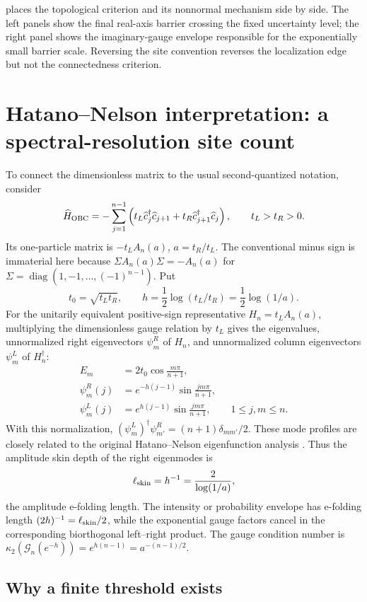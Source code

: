 \documentclass[review,hidelinks,onefignum,onetabnum]{siamart251216}
\DeclareMathOperator{\diag}{diag}
\begin{document}
 places the topological criterion and its nonnormal
mechanism side by side.  The left panels show the final real-axis barrier
crossing the fixed uncertainty level; the right panel shows
the imaginary-gauge envelope responsible for the exponentially small
barrier scale.  Reversing the site convention reverses the localization edge
but not the connectedness criterion.

\clearpage
\section{Hatano--Nelson interpretation: a spectral-resolution site count}
\label{sec:physical-conclusion}

To connect the dimensionless matrix to the usual second-quantized
notation, consider
\[
 \widehat H_{\rm OBC}=-\sum_{j=1}^{n-1}
 \left(t_L\widehat c_j^\dagger\widehat c_{j+1}
 +t_R\widehat c_{j+1}^\dagger\widehat c_j\right),
 \qquad t_L>t_R>0.
\]
Its one-particle matrix is \(-t_LA_n(a)\), \(a=t_R/t_L\).  The
conventional minus sign is immaterial here because
\(\Sigma A_n(a)\Sigma=-A_n(a)\) for
\(\Sigma=\diag(1,-1,\ldots,(-1)^{n-1})\).  Put
\[
 t_0=\sqrt{t_Lt_R},\qquad
 h=\frac12\log(t_L/t_R)
 =\frac12\log(1/a).
\]
For the unitarily equivalent positive-sign representative
\(H_n=t_LA_n(a)\), multiplying the dimensionless gauge relation by \(t_L\)
gives the eigenvalues, unnormalized right eigenvectors \(\psi_m^R\) of
\(H_n\), and unnormalized column eigenvectors \(\psi_m^L\) of
\(H_n^\dagger\):
\begin{align*}
 E_m&=2t_0\cos\frac{m\pi}{n+1},\\
 \psi_m^R(j)&=e^{-h(j-1)}\sin\frac{jm\pi}{n+1},\\
 \psi_m^L(j)&=e^{h(j-1)}\sin\frac{jm\pi}{n+1},
 \qquad 1\leq j,m\leq n.
\end{align*}
With this normalization,
\((\psi_m^L)^\dagger\psi_{m'}^R=(n+1)\delta_{mm'}/2\).
These mode profiles are closely related to the original Hatano--Nelson
eigenfunction analysis \cite{HatanoNelson1998}.
Thus the amplitude skin depth of the right eigenmodes is
\[
 \ell_{\rm skin}=h^{-1}=\frac{2}{\log(1/a)},
\]
the amplitude e-folding length.  The intensity or probability envelope has
e-folding length \((2h)^{-1}=\ell_{\rm skin}/2\), while the exponential gauge
factors cancel in the corresponding biorthogonal left--right product.  The
gauge condition number is
\(\kappa_2(\mathcal G_n(e^{-h}))
=e^{h(n-1)}=a^{-(n-1)/2}\).

\subsection{Why a finite threshold exists}
\end{document}
